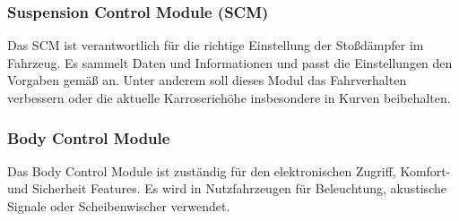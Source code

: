        \subsubsection{Suspension Control Module (SCM)}
        Das SCM ist verantwortlich für die richtige Einstellung der Stoßdämpfer im Fahrzeug. Es sammelt Daten und Informationen und
        passt die Einstellungen den Vorgaben gemäß an. Unter anderem soll dieses Modul das Fahrverhalten verbessern oder
        die aktuelle Karroseriehöhe insbesondere in Kurven beibehalten.
        \cite{suspensioncontrol.PB1}

        \subsubsection{Body Control Module}
        Das Body Control Module ist zuständig für den elektronischen Zugriff, Komfort- und Sicherheit Features. Es wird in
         Nutzfahrzeugen für Beleuchtung, akustische Signale oder Scheibenwischer verwendet.
        \cite{BCM.PB1}